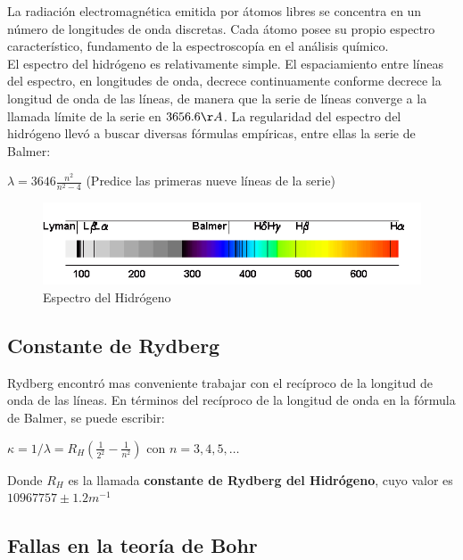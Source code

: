 \documentclass[oneside]{book}
\numberwithin{equation}{section}
\numberwithin{figure}{section}
\numberwithin{table}{section}
\begin{document}
				La radiación electromagnética emitida por átomos libres se concentra en un número de longitudes de onda discretas. Cada átomo posee su propio espectro característico, fundamento de la espectroscopía en el análisis químico.\\
				
				El espectro del hidrógeno es relativamente simple. El espaciamiento entre líneas del espectro, en longitudes de onda, decrece continuamente conforme decrece la longitud de onda de las líneas, de manera que la serie de líneas converge a la llamada límite de la serie en $3656.6 \AA$. La regularidad del espectro del hidrógeno llevó a buscar diversas fórmulas empíricas, entre ellas la serie de Balmer:
				
				\begin{center}
				$\displaystyle \lambda=3646\frac{n^2}{n^2-4}$ (Predice las primeras nueve líneas de la serie)
				\end{center}
			
			\begin{figure}[H]
				\includegraphics[scale=0.75]{EspectroH.png}
				\caption{Espectro del Hidrógeno}
			\end{figure}
			
			\subsection{Constante de Rydberg}
			
				Rydberg encontró mas conveniente trabajar con el recíproco de la longitud de onda de las líneas. En términos del recíproco de la longitud de onda en la fórmula de Balmer, se puede escribir:
				
				\begin{center}
					$\displaystyle \kappa=1/\lambda=R_H(\frac{1}{2^2}-\frac{1}{n^2})$ con $n=3,4,5,\ldots$		
				\end{center}
			
			Donde $R_H$ es la llamada \textbf{constante de Rydberg del Hidrógeno}, cuyo valor es $10967757 \pm 1.2 m^{-1}$			
			
			\subsection{Fallas en la teoría de Bohr}
			
\end{document}
